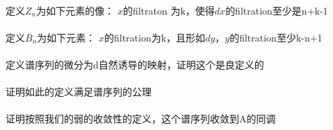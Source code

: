 \documentclass[12pt]{article}
\begin{document}
\paragraph{}定义$Z_n$为如下元素的像：
$x$的filtraton 为k，使得$dx$的filtration至少是n+k-1

\paragraph{}定义$B_n$为如下元素：
$x$的filtration为k，且形如$dy$，$y$的filtration至少k-n+1

\paragraph{}定义谱序列的微分为d自然诱导的映射，证明这个是良定义的

\paragraph{}证明如此的定义满足谱序列的公理

\paragraph{}证明按照我们的弱的收敛性的定义，这个谱序列收敛到A的同调
\end{document}
